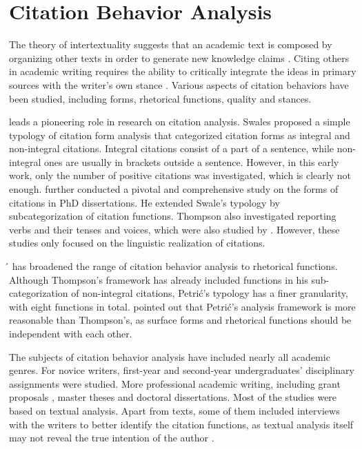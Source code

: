 \label{chap:lit_review}

\section{Citation Behavior Analysis}
The theory of intertextuality suggests that an academic text is composed by organizing other texts in order to generate new knowledge claims \citep{fairclough_intertextuality_1992, shi_textual_2010}. Citing others in academic writing requires the ability to critically integrate the ideas in primary sources with the writer’s own stance \citep{wette_source_2017}. Various aspects of citation behaviors have been studied, including forms, rhetorical functions, quality and stances.

\citet{swales_citation_1986} leads a pioneering role in research on citation analysis. Swales proposed a simple typology of citation form analysis that categorized citation forms as integral and non-integral citations. Integral citations consist of a part of a sentence, while non-integral ones are usually in brackets outside a sentence. However, in this early work, only the number of positive citations was investigated, which is clearly not enough. \citet{thompson_looking_2001} further conducted a pivotal and comprehensive study on the forms of citations in PhD dissertations. He extended Swale’s typology by subcategorization of citation functions. Thompson also investigated reporting verbs and their tenses and voices, which were also studied by \citet{manan_analysis_2014}. However, these studies only focused on the linguistic realization of citations.

\citet{petric_rhetorical_2007}́ has broadened the range of citation behavior analysis to rhetorical functions. Although Thompson’s framework has already included functions in his sub- categorization of non-integral citations, Petrić’s typology has a finer granularity, with eight functions in total. \citet{samraj_form_2013} pointed out that Petrić’s analysis framework is more reasonable than Thompson’s, as surface forms and rhetorical functions should be independent with each other.

The subjects of citation behavior analysis have included nearly all academic genres. For novice writers, first-year \citep{lee_citation_2018} and second-year \citep{wette_source_2017} undergraduates’ disciplinary assignments were studied. More professional academic writing, including grant proposals \citep{fazel_citation_2015}, master theses and doctoral dissertations. Most of the studies were based on textual analysis. Apart from texts, some of them \citep{fazel_citation_2015,harwood_interview-based_2009,wette_source_2017} included interviews with the writers to better identify the citation functions, as textual analysis itself may not reveal the true intention of the author \citep{harwood_interview-based_2009}.

